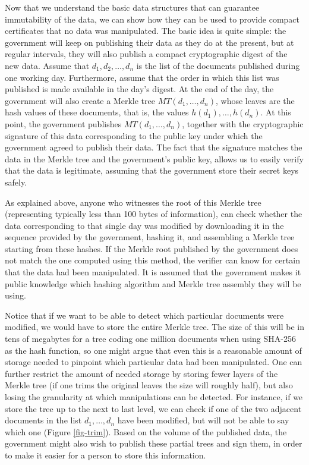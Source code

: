 \medskip
{} Now that we understand the basic data structures that can guarantee immutability of the data, we can show how they can be used to provide compact certificates that no data was manipulated. The basic idea is quite simple: the government will keep on publishing their data as they do at the present, but at regular intervals, they will also publish a compact cryptographic digest of the new data. Assume that $d_1,d_2,\ldots ,d_n$ is the list of the documents published during one working day. Furthermore, assume that the order in which this list was published is made available in the day's digest. At the end of the day, the government will also create a Merkle tree $MT(d_1,\ldots ,d_n)$, whose leaves are the hash values of these documents, that is, the values $h(d_1),\ldots ,h(d_n)$. At this point, the government publishes $MT(d_1,\ldots ,d_n)$, together with the cryptographic signature of this data corresponding to the public key under which the government agreed to publish their data. The fact that the signature matches the data in the Merkle tree and the government's public key, allows us to easily verify that the data is legitimate, assuming that the government store their secret keys safely.

As explained above, anyone who witnesses the root of this Merkle tree (representing typically less than 100 bytes of information), can check whether the data corresponding to that single day was modified by downloading it in the sequence provided by the government, hashing it, and assembling a Merkle tree starting from these hashes. If the Merkle root published by the government does not match the one computed using this method, the verifier can know for certain that the data had been manipulated. It is assumed that the government makes it public knowledge which hashing algorithm and Merkle tree assembly they will be using.

Notice that if we want to be able to detect which particular documents were modified, we would have to store the entire Merkle tree. The size of this will be in tens of megabytes for a tree coding one million documents when using SHA-256 as the hash function, so one might argue that even this is a reasonable amount of storage needed to pinpoint which particular data had been manipulated. One can further restrict the amount of needed storage by storing fewer layers of the Merkle tree (\ie if one trims the original leaves the size will roughly half), but also losing the granularity at which manipulations can be detected. For instance, if we store the tree up to the next to last level, we can check if one of the two adjacent documents in the list $d_1,\ldots ,d_n$ have been modified, but will not be able to say which one (Figure \ref{fig-trim}). Based on the volume of the published data, the government might also wish to publish these partial trees and sign them, in order to make it easier for a person to store this information.

